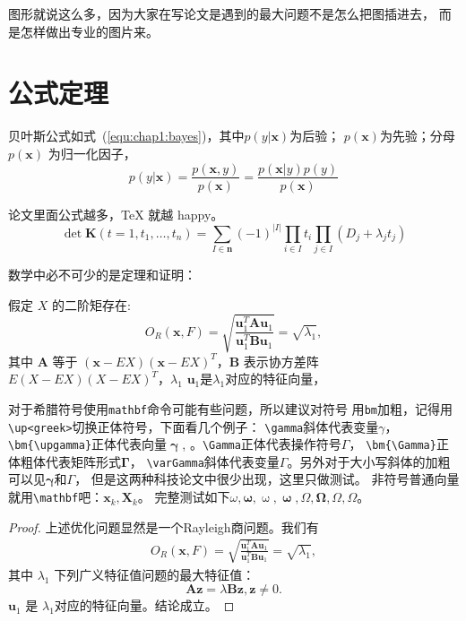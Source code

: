 图形就说这么多，因为大家在写论文是遇到的最大问题不是怎么把图插进去，
而是怎样做出专业的图片来。

\section{公式定理}
\label{sec:equation}

贝叶斯公式如式~(\ref{equ:chap1:bayes})，其中$p(y|\mathbf{x})$为后验；
$p(\mathbf{x})$为先验；分母$p(\mathbf{x})$ 为归一化因子，
\begin{equation}
\label{equ:chap1:bayes}
p(y|\mathbf{x}) = \frac{p(\mathbf{x},y)}{p(\mathbf{x})}=
\frac{p(\mathbf{x}|y)p(y)}{p(\mathbf{x})} 
\end{equation}

论文里面公式越多，\TeX{} 就越 happy。
\newcommand{\envert}[1]{\left\lvert#1\right\rvert} 
\begin{equation}\label{detK2}
\det\mathbf{K}(t=1,t_1,\dots,t_n)=\sum_{I\in\mathbf{n}}(-1)^{\envert{I}}
\prod_{i\in I}t_i\prod_{j\in I}(D_j+\lambda_jt_j)
\end{equation} 

数学中必不可少的是定理和证明：
\begin{theorem}
  \label{chapTSthm:rayleigh solution}
  假定 $X$ 的二阶矩存在:
  \begin{equation}
         O_R(\mathbf{x},F)=\sqrt{\frac{\mathbf{u}_1^T\mathbf{A}\mathbf{u}_1} {\mathbf{u}_1^T\mathbf{B}\mathbf{u}_1}}=\sqrt{\lambda_1},
  \end{equation}
  其中 $\mathbf{A}$ 等于 $(\mathbf{x}-EX)(\mathbf{x}-EX)^T$，$\mathbf{B}$ 表示协方差阵 $E(X-EX)(X-EX)^T$，$\lambda_1$
$\mathbf{u}_1$是$\lambda_1$对应的特征向量，
\end{theorem}

对于希腊符号使用\verb|mathbf|命令可能有些问题，所以建议对符号
用\verb|bm|加粗，记得用\verb|\up<greek>|切换正体符号，下面看几个例子：
\verb|\gamma|斜体代表变量$\gamma$，\verb|\bm{\upgamma}|正体代表向量$\bm{\upgamma}$,
。\verb|\Gamma|正体代表操作符号$\Gamma$，
\verb|\bm{\Gamma}|正体粗体代表矩阵形式$\bm{\Gamma}$，
\verb|\varGamma|斜体代表变量$\varGamma$。另外对于大小写斜体的加粗可以见$\bm{\gamma}$和$\bm{\varGamma}$，
但是这两种科技论文中很少出现，这里只做测试。
非符号普通向量就用\verb|\mathbf|吧：$\mathbf{x}_k,\mathbf{X}_k$。
完整测试如下$\omega,\bm{\omega},\upomega,\bm{\upomega},\Omega,\bm{\Omega},\varOmega,\bm{\varOmega}$。

\begin{proof}
上述优化问题显然是一个Rayleigh商问题。我们有
  \begin{align}
     O_R(\mathbf{x},F)=\sqrt{\frac{\mathbf{u}_1^T\mathbf{A}\mathbf{u}_1} {\mathbf{u}_1^T\mathbf{B}\mathbf{u}_1}}=\sqrt{\lambda_1},
 \end{align}
 其中 $\lambda_1$ 下列广义特征值问题的最大特征值：
$$
\mathbf{A}\mathbf{z}=\lambda\mathbf{B}\mathbf{z}, \mathbf{z}\neq 0.
$$
 $\mathbf{u}_1$ 是 $\lambda_1$对应的特征向量。结论成立。
\end{proof}


